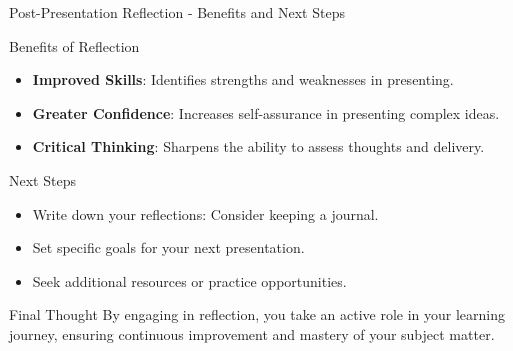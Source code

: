 \documentclass[aspectratio=169]{beamer}
\begin{document}
\begin{frame}[fragile]{Post-Presentation Reflection - Benefits and Next Steps}
    \begin{block}{Benefits of Reflection}
        \begin{itemize}
            \item \textbf{Improved Skills}: Identifies strengths and weaknesses in presenting.
            \item \textbf{Greater Confidence}: Increases self-assurance in presenting complex ideas.
            \item \textbf{Critical Thinking}: Sharpens the ability to assess thoughts and delivery.
        \end{itemize}
    \end{block}

    \begin{block}{Next Steps}
        \begin{itemize}
            \item Write down your reflections: Consider keeping a journal.
            \item Set specific goals for your next presentation.
            \item Seek additional resources or practice opportunities.
        \end{itemize}
    \end{block}

    \begin{block}{Final Thought}
        By engaging in reflection, you take an active role in your learning journey, ensuring continuous improvement and mastery of your subject matter.
    \end{block}
\end{frame}
\end{document}

